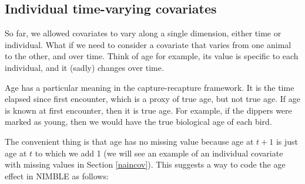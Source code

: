 \documentclass[
  12pt,
]{krantz}
\begin{document}
\subsection{Individual time-varying covariates}\label{agecov}

So far, we allowed covariates to vary along a single dimension, either time or individual. What if we need to consider a covariate that varies from one animal to the other, and over time. Think of age for example, its value is specific to each individual, and it (sadly) changes over time.

Age has a particular meaning in the capture-recapture framework. It is the time elapsed since first encounter, which is a proxy of true age, but not true age. If age is known at first encounter, then it is true age. For example, if the dippers were marked as young, then we would have the true biological age of each bird.

The convenient thing is that age has no missing value because age at \(t+1\) is just age at \(t\) to which we add 1 (we will see an example of an individual covariate with missing values in Section \ref{naincov}). This suggests a way to code the age effect in NIMBLE as follows:
\end{document}
